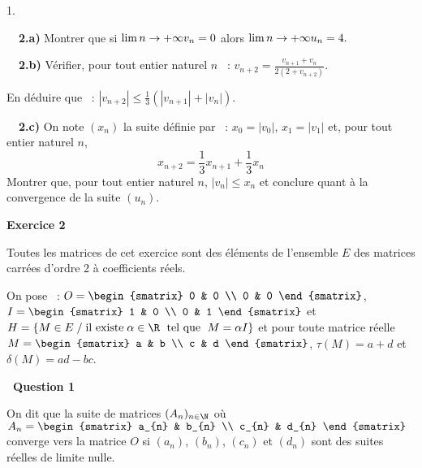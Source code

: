 \documentclass[11pt]{article}%
\begin{document}
\begin{noliste}{1.}
 \setlength{\itemsep}{4mm}
\item[ \ \textbf{\ 2.a)}] Montrer que si $ \lim{n \rightarrow
 + \infty}v_{n} = 0$ alors $ \lim{n \rightarrow + \infty}u_{n} = 4.$

\item[ \ \textbf{\ 2.b)}] Vérifier, pour tout entier naturel $n$~ : $
v_{n + 2} = \frac{v_{n + 1} + v_{n}}{ 2(2 + v_{n + 2})}.$

En déduire que~ : $ |v_{n + 2}|\leq \frac{1}{ 3}\left(|v_{n + 1}| + 
|v_{n}| \right).$

\item[ \ \textbf{\ 2.c)}] On note $(x_{n})$ la suite définie par~ :
$x_{0} = |v_{0}|$, 
$x_{1} = |v_{1}|$ et, pour tout entier naturel $n$, 
\[
x_{n + 2} = \frac{1}{3} x_{n + 1} + \frac{1}{3}x_{n}
\]
Montrer que, pour tout entier naturel $n$, $|v_{n}| \leq x_{n}$ et
conclure
quant à la convergence de la suite $(u_{n})$.
\end{noliste}

\newpage

\begin{center}
\textbf{\large Exercice 2 }
\end{center}

\noindent Toutes les matrices de cet exercice sont des éléments
de l'ensemble $E$ des matrices carrées d'ordre 2 à coefficients réels.

On pose~ : $O = 
\begin{smatrix}
0 & 0 \\
0 & 0
\end{smatrix}
$, $I = 
\begin{smatrix}
1 & 0 \\
0 & 1
\end{smatrix}
$ et $H = \left\{M \in E \; / \; \text{il existe}\; \alpha \in \R
\;\text{ tel que }\; M = \alpha I \right\}$ et pour toute matrice
réelle $M = 
\begin{smatrix}
a & b \\
c & d
\end{smatrix}
$, $\tau(M) = a + d$ et $\delta(M) = ad-bc$.

\textbf{\ Question 1}

On dit que la suite de matrices $(A_{n})_{n \in \N}$ où $A_{n} = 
\begin{smatrix}
a_{n} & b_{n} \\
c_{n} & d_{n}
\end{smatrix}
$ converge vers la matrice $O$ si $(a_{n})$, $(b_{n})$, $(c_{n})$ et
$(d_{n})$ sont
des suites réelles de limite nulle.
\end{document}
